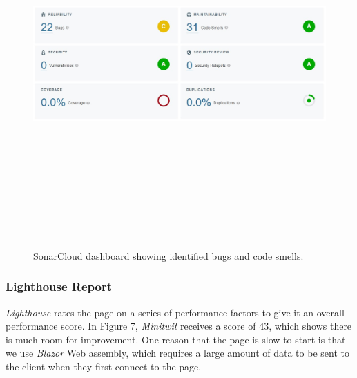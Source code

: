 \begin{figure}[H]
    \centering
    \includegraphics[width=16cm,height=14cm,keepaspectratio]{Diagrams/sonarcloud.jpg}
    \caption{SonarCloud dashboard showing identified bugs and code smells.}
    \label{ComponentDiagram_1}
\end{figure}

\subsubsection{Lighthouse Report}
\textit{Lighthouse} rates the page on a series of performance factors to give it an overall performance score. In Figure 7, \textit{Minitwit} receives a score of 43, which shows there is much room for improvement. One reason that the page is slow to start is that we use \textit{Blazor} Web assembly, which requires a large amount of data to be sent to the client when they first connect to the page.

